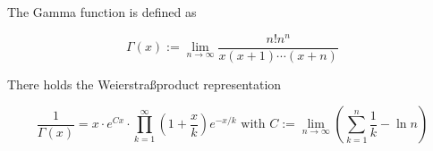 \documentclass[a4paper, 11pt]{article}
\begin{document}
The Gamma function is defined as

    \[ \Gamma(x) := \lim \limits_{n \to \infty} \frac{n!n^n}{x(x + 1) \cdots (x+n)} \]

There holds the Weierstra\ss product representation

\[ \displaystyle\frac{1}{\Gamma(x)} = x \cdot e^{Cx} \cdot \prod_{k=1}^{\infty}\left(1 + \frac{x}{k}\right)e^{-x/k} \text{ with } C := \lim \limits_{n \to \infty}\left(\sum_{k=1}^{n}\frac{1}{k} - \ln n\right) \]
\end{document}
